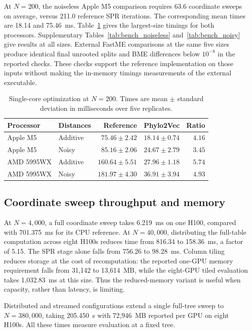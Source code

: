 \documentclass[11pt,a4paper]{article}
\makeatletter
\DeclareRobustCommand{\_}{\ifmmode\nfss@text{\textunderscore}\else\textunderscore\allowbreak\fi}
\theoremstyle{definition}
\makeatother
\begin{document}
At $N=200$, the noiseless Apple M5 comparison requires 63.6 coordinate sweeps on average, versus 211.0 reference SPR iterations.
The corresponding mean times are 18.14 and 75.46~ms.
Table~\ref{tab:cpu_summary} gives the largest-size timings for both processors.
Supplementary Tables~\ref{tab:bench_noiseless} and~\ref{tab:bench_noisy} give results at all sizes.
External FastME comparisons at the same five sizes produce identical final unrooted splits and BME differences below $10^{-8}$ in the reported checks.
These checks support the reference implementation on those inputs without making the in-memory timings measurements of the external executable.

\begin{table}[tb]
\centering
\caption{Single-core optimization at $N=200$. Times are mean $\pm$ standard deviation in milliseconds over five replicates.}
\label{tab:cpu_summary}
\small
\begin{tabular}{@{}llrrr@{}}
\toprule
Processor & Distances & Reference & Phylo2Vec & Ratio\\
\midrule
Apple M5 & Additive & $75.46\pm2.42$ & $18.14\pm0.74$ & $4.16$\\
Apple M5 & Noisy & $85.16\pm2.06$ & $24.67\pm2.79$ & $3.45$\\
AMD 5995WX & Additive & $160.64\pm5.51$ & $27.96\pm1.18$ & $5.74$\\
AMD 5995WX & Noisy & $181.97\pm4.30$ & $36.91\pm3.94$ & $4.93$\\
\bottomrule
\end{tabular}
\end{table}

\subsection{Coordinate sweep throughput and memory}

At $N=4{,}000$, a full coordinate sweep takes 6.219~ms on one H100, compared with 701.375~ms for its CPU reference.
At $N=40{,}000$, distributing the full-table computation across eight H100s reduces time from 816.34 to 158.36~ms, a factor of 5.15.
The SPR stage alone falls from 756.26 to 98.28~ms.
Column tiling reduces storage at the cost of recomputation: the reported one-GPU memory requirement falls from 31,142 to 13,614~MB, while the eight-GPU tiled evaluation takes 1,032.83~ms at this size.
Thus the reduced-memory variant is useful when capacity, rather than latency, is limiting.

Distributed and streamed configurations extend a single full-tree sweep to $N=380{,}000$, taking 205.450~s with 72,946~MB reported per GPU on eight H100s.
All these times measure evaluation at a fixed tree.
\end{document}
